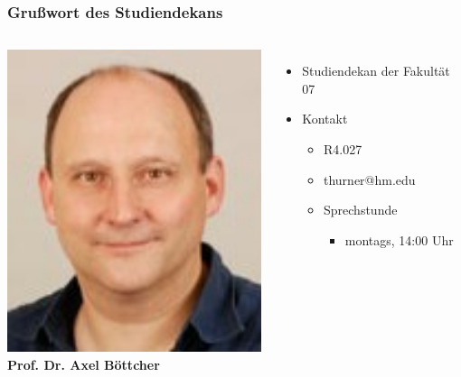 \documentclass{beamer}
\begin{document}
    \begin{frame} %
    	\frametitle{Grußwort des Studiendekans}
    	\begin{columns}
    		\includegraphics[width=1.0\textwidth]{boettcher.jpg}
    		\textbf{Prof. Dr. Axel Böttcher}
    		\begin{itemize}
    			\item Studiendekan der Fakultät 07
    			\bigskip
    			\item Kontakt
    			\begin{itemize}
    				\item R4.027
    				\item thurner@hm.edu
    				\item Sprechstunde
    				\begin{itemize}
    					\item montags, 14:00 Uhr
    				\end{itemize}
    			\end{itemize}
    		\end{itemize}
    	\end{columns}
    \end{frame}
    
\end{document}
